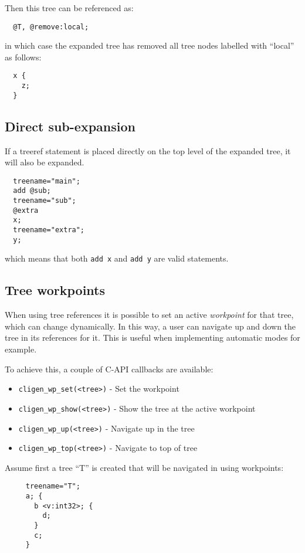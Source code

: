 \documentclass[a4paper, 10pt] {article}
\begin{document}
Then this tree can be referenced as:
\begin{verbatim}
  @T, @remove:local;
\end{verbatim}
in which case the expanded tree has removed all tree nodes labelled with ``local'' as follows:

\begin{verbatim}
  x {
    z;
  }
\end{verbatim}

\subsection{Direct sub-expansion}

If a treeref statement is placed directly on the top level of the
expanded tree, it will also be expanded.
\begin{verbatim}
  treename="main";
  add @sub;
  treename="sub";
  @extra
  x;
  treename="extra";
  y;
\end{verbatim}

which means that both {\tt add x} and {\tt add y} are valid statements.

\subsection{Tree workpoints}

When using tree references it is possible to set an active {\em workpoint}
for that tree, which can change dynamically. In this way,
a user can navigate up and down the tree in its references for it. This
is useful when implementing automatic modes for example.

To achieve this, a couple of C-API callbacks are available:
\begin{itemize}
  \item {\tt cligen\_wp\_set(<tree>)} - Set the workpoint
  \item {\tt cligen\_wp\_show(<tree>)} - Show the tree at the active workpoint
  \item {\tt cligen\_wp\_up(<tree>)} - Navigate up in the tree
  \item {\tt cligen\_wp\_top(<tree>)} - Navigate to top of tree
\end{itemize}

Assume first a tree ``T'' is created that will be navigated in using workpoints:
\begin{verbatim}
     treename="T";
     a; {
       b <v:int32>; {
         d;
       }
       c;
     }
\end{verbatim}
\end{document}
